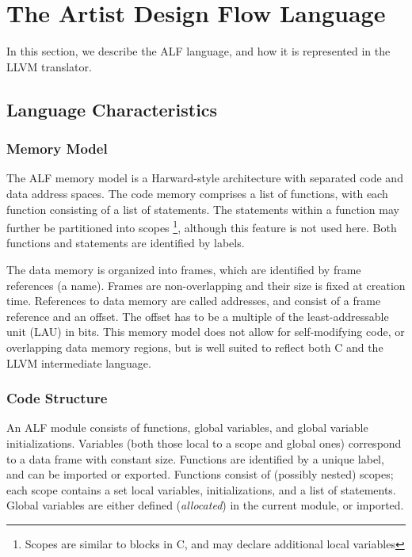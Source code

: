 %
%


\begin{abstract}
\end{abstract}


%
%
\section{The Artist Design Flow Language}
\label{sec:alf}
In this section, we describe the ALF language, and how it is represented in the
LLVM translator.

\subsection{Language Characteristics}

\subsubsection{Memory Model}
\label{par:memorymodel}

The ALF memory model is a Harward-style architecture with separated code and
data address spaces. The code memory comprises a list of functions, with each
function consisting of a list of statements. The statements within a function
may further be partitioned into scopes \footnote{Scopes are similar to blocks in
C, and may declare additional local variables}, although this feature is not
used here. Both functions and statements are identified by labels.

The data memory is organized into frames, which are identified by frame
references (a name). Frames are non-overlapping and their size is fixed at
creation time. References to data memory are called addresses, and consist of a
frame reference and an offset. The offset has to be a multiple of the
least-addressable unit (LAU) in bits. This memory model does not allow for
self-modifying code, or overlapping data memory regions, but is well suited to
reflect both C and the LLVM intermediate language.

\subsubsection{Code Structure}
\label{par:structure}
An ALF module consists of functions, global variables, and global
variable initializations. Variables (both those local to a scope and
global ones) correspond to a data frame with constant size. Functions
are identified by a unique label, and can be imported or
exported. Functions consist of (possibly nested) scopes; each scope
contains a set local variables, initializations, and a list of
statements. Global variables are either defined (\emph{allocated}) in
the current module, or imported.

